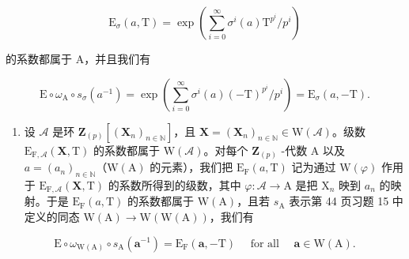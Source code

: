 \[
\mathrm{E} _ {\sigma} (a, \mathrm{T}) = \exp (\sum_ {i = 0} ^ {\infty} \sigma^ {i} (a) \mathrm{T} ^ {p ^ {i}} / p ^ {i})
\]

的系数都属于 A，并且我们有

\[
\mathrm{E} \circ \omega_ {\mathrm{A}} \circ s _ {\sigma} (a ^ {- 1}) = \exp \left(\sum_ {i = 0} ^ {\infty} \sigma^ {i} (a) (- \mathrm{T}) ^ {p ^ {i}} / p ^ {i}\right) = \mathrm{E} _ {\sigma} (a, - \mathrm{T}).
\]

\begin{enumerate}
\def\labelenumi{\alph{enumi})}
\setcounter{enumi}{5}
\tightlist
\item
  设 \(\mathcal{A}\) 是环 \(\mathbf{Z}_{(p)}[(\mathbf{X}_n)_{n\in\mathbb{N}}]\)，且 \(\mathbf{X} = (\mathbf{X}_n)_{n\in\mathbb{N}} \in \mathrm{W}(\mathcal{A})\)。级数 \(\mathrm{E}_{\mathrm{F},\mathcal{A}}(\mathbf{X},\mathrm{T})\) 的系数都属于 \(\mathrm{W}(\mathcal{A})\)。对每个 \(\mathbf{Z}_{(p)}\) -代数 A 以及 \(a = (a_n)_{n\in\mathbb{N}}\)（\(\mathrm{W}(\mathrm{A})\) 的元素），我们把 \(\mathrm{E}_{\mathrm{F}}(a,\mathrm{T})\) 记为通过 \(\mathrm{W}(\varphi)\) 作用于 \(\mathrm{E}_{\mathrm{F},\mathcal{A}}(\mathbf{X},\mathrm{T})\) 的系数所得到的级数，其中 \(\varphi: \mathcal{A} \to \mathrm{A}\) 是把 \(\mathrm{X}_n\) 映到 \(a_n\) 的映射。于是 \(\mathrm{E}_{\mathrm{F}}(a,\mathrm{T})\) 的系数都属于 \(\mathrm{W}(\mathrm{A})\)，且若 \(s_{\mathrm{A}}\) 表示第 44 页习题 15 中定义的同态 \(\mathrm{W}(\mathrm{A}) \to \mathrm{W}(\mathrm{W}(\mathrm{A}))\)，我们有
\end{enumerate}

\[
\mathrm{E} \circ \omega_ {\mathrm{W(A)}} \circ s _ {\mathrm{A}} (\boldsymbol {a} ^ {- 1}) = \mathrm{E} _ {\mathrm{F}} (\boldsymbol {a}, - \mathrm{T}) \quad \text { for all } \quad \boldsymbol {a} \in \mathrm{W(A)}.
\]

